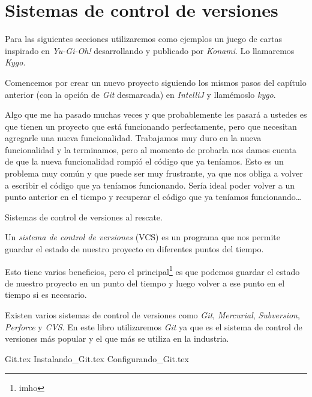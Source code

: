 \section{Sistemas de control de versiones}
  Para las siguientes secciones utilizaremos como ejemplos un juego de cartas inspirado en
  \textit{Yu-Gi-Oh!} desarrollando y publicado por \textit{Konami}.
  Lo llamaremos \textit{Kygo}.

  Comencemos por crear un nuevo proyecto siguiendo los mismos pasos del capítulo anterior (con la 
  opción de \textit{Git} desmarcada) en \textit{IntelliJ} y llamémoslo \textit{kygo}.

  Algo que me ha pasado muchas veces y que probablemente les pasará a ustedes es que tienen un
  proyecto que está funcionando perfectamente, pero que necesitan agregarle una nueva funcionalidad.
  Trabajamos muy duro en la nueva funcionalidad y la terminamos, pero al momento de probarla nos
  damos cuenta de que la nueva funcionalidad rompió el código que ya teníamos.
  Esto es un problema muy común y que puede ser muy frustrante, ya que nos obliga a volver a
  escribir el código que ya teníamos funcionando.
  Sería ideal poder volver a un punto anterior en el tiempo y recuperar el código que ya teníamos
  funcionando\dots

  Sistemas de control de versiones al rescate.

  \begin{defaultbox}
    Un \textit{sistema de control de versiones} (VCS) es un 
    programa que nos permite guardar el estado de nuestro proyecto en diferentes puntos del tiempo.
  \end{defaultbox}

  Esto tiene varios beneficios, pero el principal\footnote{imho} es que podemos guardar el estado de 
  nuestro proyecto en un punto del tiempo y luego volver a ese punto en el tiempo si es necesario.

  Existen varios sistemas de control de versiones como \textit{Git}, \textit{Mercurial}, 
  \textit{Subversion}, \textit{Perforce} y \textit{CVS}.
  En este libro utilizaremos \textit{Git} ya que es el sistema de control de versiones más popular
  y el que más se utiliza en la industria.

  {Git.tex}
  {Instalando_Git.tex}
  {Configurando_Git.tex}
  